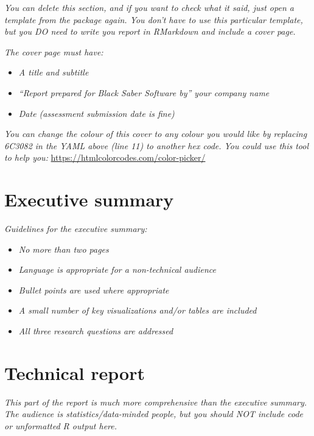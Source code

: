 \documentclass[
          english,
          paper=a4,
              ,captions=tableheading
  ]{scrartcl}
\providecommand{\tightlist}{%
        \setlength{\itemsep}{0pt}\setlength{\parskip}{0pt}}
\begin{document}
\emph{You can delete this section, and if you want to check what it
said, just open a template from the package again. You don't have to use
this particular template, but you DO need to write you report in
RMarkdown and include a cover page.}

\emph{The cover page must have:}

\begin{itemize}
\tightlist
\item
  \emph{A title and subtitle}
\item
  \emph{``Report prepared for Black Saber Software by'' your company
  name}
\item
  \emph{Date (assessment submission date is fine)}
\end{itemize}

\emph{You can change the colour of this cover to any colour you would
like by replacing 6C3082 in the YAML above (line 11) to another hex
code. You could use this tool to help you:}
\url{https://htmlcolorcodes.com/color-picker/}

\newpage

\hypertarget{executive-summary}{%
\section{Executive summary}\label{executive-summary}}

\emph{Guidelines for the executive summary:}

\begin{itemize}
\tightlist
\item
  \emph{No more than two pages}
\item
  \emph{Language is appropriate for a non-technical audience}
\item
  \emph{Bullet points are used where appropriate}
\item
  \emph{A small number of key visualizations and/or tables are included}
\item
  \emph{All three research questions are addressed}
\end{itemize}

\newpage

\hypertarget{technical-report}{%
\section{Technical report}\label{technical-report}}

\emph{This part of the report is much more comprehensive than the
executive summary. The audience is statistics/data-minded people, but
you should NOT include code or unformatted R output here.}
\end{document}
